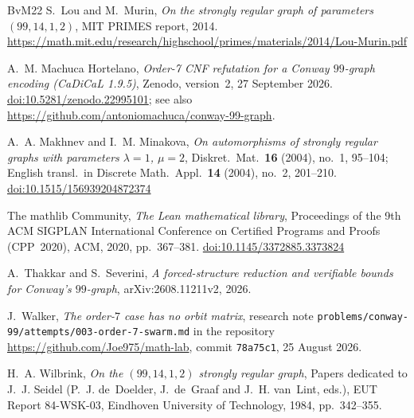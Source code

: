\documentclass[11pt,a4paper]{amsart}
\theoremstyle{definition}
\theoremstyle{remark}
\begin{document}
\begin{thebibliography}{BvM22}
 S.~Lou and M.~Murin, \emph{On the strongly regular graph of parameters $(99,14,1,2)$},
MIT PRIMES report, 2014.
\url{https://math.mit.edu/research/highschool/primes/materials/2014/Lou-Murin.pdf}

 A.~M. Machuca Hortelano, \emph{Order-7 CNF refutation for a Conway $99$-graph encoding
(CaDiCaL 1.9.5)}, Zenodo, version~2, 27 September 2026.
\href{https://doi.org/10.5281/zenodo.22995101}{doi:10.5281/zenodo.22995101}; see also
\url{https://github.com/antoniomachuca/conway-99-graph}.

 A.~A. Makhnev and I.~M. Minakova, \emph{On automorphisms of strongly regular graphs with
parameters $\lambda=1$, $\mu=2$}, Diskret.\ Mat.\ \textbf{16} (2004), no.~1, 95--104; English transl.\ in
Discrete Math.\ Appl.\ \textbf{14} (2004), no.~2, 201--210.
\href{https://doi.org/10.1515/156939204872374}{doi:10.1515/156939204872374}

 The mathlib Community, \emph{The Lean mathematical library}, Proceedings of the 9th ACM
SIGPLAN International Conference on Certified Programs and Proofs (CPP~2020), ACM, 2020, pp.~367--381.
\href{https://doi.org/10.1145/3372885.3373824}{doi:10.1145/3372885.3373824}

 A.~Thakkar and S.~Severini, \emph{A forced-structure reduction and verifiable bounds for
Conway's $99$-graph}, arXiv:2608.11211v2, 2026.

 J.~Walker, \emph{The order-$7$ case has no orbit matrix}, research note
\texttt{problems/conway-99/attempts/003-order-7-swarm.md} in the repository
\url{https://github.com/Joe975/math-lab}, commit \texttt{78a75c1}, 25 August 2026.

 H.~A. Wilbrink, \emph{On the $(99,14,1,2)$ strongly regular graph}, Papers dedicated to
J.~J. Seidel (P.~J. de~Doelder, J.~de~Graaf and J.~H. van~Lint, eds.), EUT Report 84-WSK-03, Eindhoven
University of Technology, 1984, pp.~342--355.

\end{thebibliography}
\end{document}
